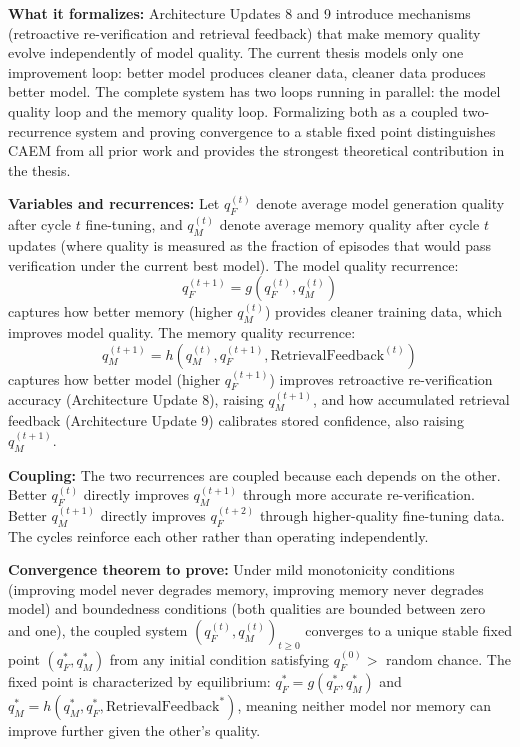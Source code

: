 \documentclass[11pt,a4paper]{article}
\newcommand{\theorybox}[2]{%
\begin{tcolorbox}[enhanced,breakable,
  colback=LightForest,colframe=ForestGreen,boxrule=1.5pt,arc=4pt,
  left=8pt,right=8pt,top=6pt,bottom=6pt,
  title={\bfseries\small\color{white}#1},
  attach boxed title to top left={yshift=-2mm,xshift=6mm},
  boxed title style={colback=ForestGreen,arc=3pt,boxrule=0pt,
    left=4pt,right=4pt,top=2pt,bottom=2pt}]
#2
\end{tcolorbox}}
\begin{document}
\theorybox{THEORY UPDATE 3: Formalization of Dual Improvement Loops}{
\textbf{What it formalizes:} Architecture Updates 8 and 9 introduce mechanisms (retroactive re-verification and retrieval feedback) that make memory quality evolve independently of model quality. The current thesis models only one improvement loop: better model produces cleaner data, cleaner data produces better model. The complete system has two loops running in parallel: the model quality loop and the memory quality loop. Formalizing both as a coupled two-recurrence system and proving convergence to a stable fixed point distinguishes CAEM from all prior work and provides the strongest theoretical contribution in the thesis.

\textbf{Variables and recurrences:} Let $q_F^{(t)}$ denote average model generation quality after cycle $t$ fine-tuning, and $q_M^{(t)}$ denote average memory quality after cycle $t$ updates (where quality is measured as the fraction of episodes that would pass verification under the current best model). The model quality recurrence:
\[
q_F^{(t+1)} = g(q_F^{(t)}, q_M^{(t)})
\]
captures how better memory (higher $q_M^{(t)}$) provides cleaner training data, which improves model quality. The memory quality recurrence:
\[
q_M^{(t+1)} = h(q_M^{(t)}, q_F^{(t+1)}, \text{RetrievalFeedback}^{(t)})
\]
captures how better model (higher $q_F^{(t+1)}$) improves retroactive re-verification accuracy (Architecture Update 8), raising $q_M^{(t+1)}$, and how accumulated retrieval feedback (Architecture Update 9) calibrates stored confidence, also raising $q_M^{(t+1)}$.

\textbf{Coupling:} The two recurrences are coupled because each depends on the other. Better $q_F^{(t)}$ directly improves $q_M^{(t+1)}$ through more accurate re-verification. Better $q_M^{(t+1)}$ directly improves $q_F^{(t+2)}$ through higher-quality fine-tuning data. The cycles reinforce each other rather than operating independently.

\textbf{Convergence theorem to prove:} Under mild monotonicity conditions (improving model never degrades memory, improving memory never degrades model) and boundedness conditions (both qualities are bounded between zero and one), the coupled system $(q_F^{(t)}, q_M^{(t)})_{t \geq 0}$ converges to a unique stable fixed point $(q_F^*, q_M^*)$ from any initial condition satisfying $q_F^{(0)} > $ random chance. The fixed point is characterized by equilibrium: $q_F^* = g(q_F^*, q_M^*)$ and $q_M^* = h(q_M^*, q_F^*, \text{RetrievalFeedback}^*)$, meaning neither model nor memory can improve further given the other's quality.

}
\end{document}
